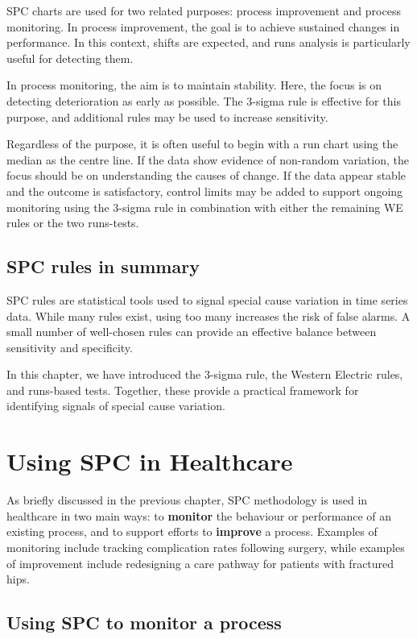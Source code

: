 \documentclass[
]{book}
\begin{document}
SPC charts are used for two related purposes: process improvement and
process monitoring. In process improvement, the goal is to achieve
sustained changes in performance. In this context, shifts are expected,
and runs analysis is particularly useful for detecting them.

In process monitoring, the aim is to maintain stability. Here, the focus
is on detecting deterioration as early as possible. The 3-sigma rule is
effective for this purpose, and additional rules may be used to increase
sensitivity.

Regardless of the purpose, it is often useful to begin with a run chart
using the median as the centre line. If the data show evidence of
non-random variation, the focus should be on understanding the causes of
change. If the data appear stable and the outcome is satisfactory,
control limits may be added to support ongoing monitoring using the
3-sigma rule in combination with either the remaining WE rules or the
two runs-tests.

\section{SPC rules in summary}\label{spc-rules-in-summary}

SPC rules are statistical tools used to signal special cause variation
in time series data. While many rules exist, using too many increases
the risk of false alarms. A small number of well-chosen rules can
provide an effective balance between sensitivity and specificity.

In this chapter, we have introduced the 3-sigma rule, the Western
Electric rules, and runs-based tests. Together, these provide a
practical framework for identifying signals of special cause variation.

\chapter{Using SPC in Healthcare}\label{using}

As briefly discussed in the previous chapter, SPC methodology is used in
healthcare in two main ways: to \textbf{monitor} the behaviour or
performance of an existing process, and to support efforts to
\textbf{improve} a process. Examples of monitoring include tracking
complication rates following surgery, while examples of improvement
include redesigning a care pathway for patients with fractured hips.

\section{Using SPC to monitor a
process}\label{using-spc-to-monitor-a-process}
\end{document}
